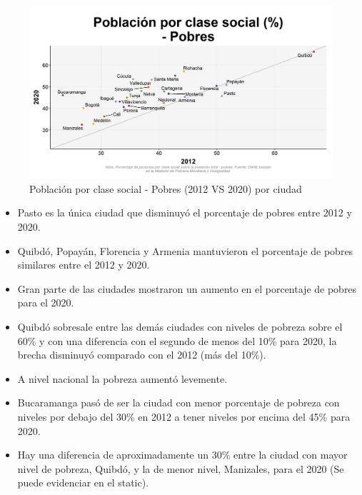     \begin{figure}[H]
        \caption{Población por clase social - Pobres (2012 VS 2020) por ciudad \label{map_result_2} }
        \begin{center}
        \includegraphics[width=\textwidth,keepaspectratio]{img/var_241_scatter_time.png}
        \end{center}
    \end{figure}
            \begin{itemize}
                    \item Pasto es la única ciudad que disminuyó el porcentaje de pobres entre 2012 y 2020.
                    \item Quibdó, Popayán, Florencia y Armenia mantuvieron el porcentaje de pobres similares entre el 2012 y 2020.
                    \item Gran parte de las ciudades mostraron un aumento en el porcentaje de pobres para el 2020.
                    \item Quibdó sobresale entre las demás ciudades con niveles de pobreza sobre el 60\% y con una diferencia con el segundo de menos del 10\% para 2020, la brecha disminuyó comparado con el 2012 (más del 10\%).
                    \item A nivel nacional la pobreza aumentó levemente.
                    \item Bucaramanga pasó de ser la ciudad con menor porcentaje de pobreza con niveles por debajo del 30\% en 2012 a tener niveles por encima del 45\% para 2020.
                    \item Hay una diferencia de aproximadamente un 30\% entre la ciudad con mayor nivel de pobreza, Quibdó, y la de menor nivel, Manizales, para el 2020 (Se puede evidenciar en el static).
                \end{itemize}

